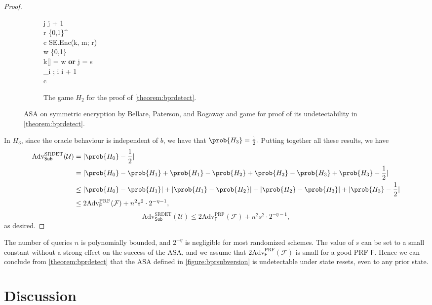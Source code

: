 \begin{proof}
\begin{figure}
\begin{subfigure}[t]{0.6\textwidth}
\begin{pchstack}
{	\pcind \pcind j \leftarrow j + 1 \\
	\pcind \pcind r \sample \{0,1\}^ \\
	\pcind \pcind c \leftarrow \textsf{SE.Enc}(k, m; r) \\
	\pcind \pcind w \sample \{0,1\} \\
	\pcind \pcuntil k[\tau] = w \textbf{ or } j = s\\
	\pcind \tau_i \leftarrow \tau; i \leftarrow i + 1 \\
	\pcreturn c
}
\end{pchstack}
\caption{The game $H_2$ for the proof of \autoref{theorem:bprdetect}.}
\label{game:H2}
\end{subfigure}
\caption{ASA on symmetric encryption by Bellare, Paterson, and Rogaway \cite{C:BelPatRog14} and game for proof of its undetectability in \autoref{theorem:bprdetect}.}
\end{figure}
 
In $H_3$, since the oracle behaviour is independent of $b$, we have that $\prob{H_3}= \frac{1}{2}.$ Putting together all these results, we have
\iffullversion
\begin{align*}
\text{Adv}^\text{SRDET}_\textsf{Sub}(\mathcal{U})
&= |\prob{H_0}-\frac{1}{2}| \\
&= |\prob{H_0}-\prob{H_1}+\prob{H_1}-\prob{H_2}+\prob{H_2}-\prob{H_3}+\prob{H_3}-\frac{1}{2}| \\
&\le |\prob{H_0}-\prob{H_1}|+|\prob{H_1}-\prob{H_2}|+|\prob{H_2}-\prob{H_3}|+|\prob{H_3}-\frac{1}{2}| \\
&\le 2\text{Adv}^{\mathrm{PRF}}_\mathsf{F}(\mathcal{F}) + n^2s^2\cdot 2^{-\eta-1},
\end{align*}
\else
\[
\text{Adv}^\text{SRDET}_\textsf{Sub}(\mathcal{U}) \le 2\text{Adv}^{\mathrm{PRF}}_\mathsf{F}(\mathcal{F}) + n^2s^2\cdot 2^{-\eta-1},
\]
\fi
as desired.
\end{proof}

The number of queries $n$ is polynomially bounded, and $2^{-\eta}$ is negligible for most randomized schemes. The value of $s$ can be set to a small constant without a strong effect on the success of the ASA, and we assume that $2\text{Adv}^{\mathrm{PRF}}_\mathsf{F}(\mathcal{F})$ is small for a good PRF $\mathsf{F}$. Hence we can conclude from \autoref{theorem:bprdetect} that the ASA defined in \autoref{figure:bprsubversion} is undetectable under state resets, even to any prior state.

\section{Discussion}

